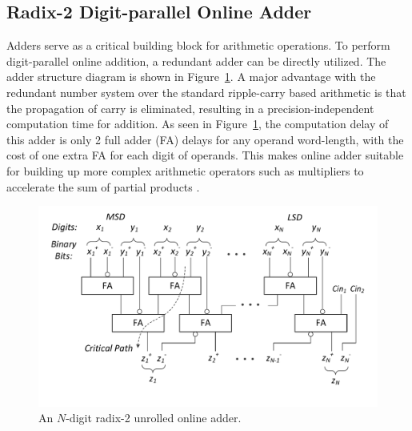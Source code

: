\documentclass{acm_proc_article-sp}
\begin{document}
\subsection{Radix-2 Digit-parallel Online Adder}\label{subsec:OnlineAdder}
Adders serve as a critical building block for arithmetic operations. To perform digit-parallel online addition, a redundant adder can be directly utilized. The adder structure diagram is shown in Figure~\ref{Fig:Radix2SD_adder}. A major advantage with the redundant number system over the standard ripple-carry based arithmetic is that the propagation of carry is eliminated, resulting in a precision-independent computation time for addition. As seen in Figure~\ref{Fig:Radix2SD_adder}, the computation delay of this adder is only 2 full adder (FA) delays for any operand word-length, with the cost of one extra FA for each digit of operands. This makes online adder suitable for building up more complex arithmetic operators such as multipliers to accelerate the sum of partial products \cite{RedundantMult_1987,RedundantMult_1985}.
% 
%
\begin{figure}
\includegraphics[width=.5\textwidth]{./Figures/SDAdder.pdf}
\vspace{-8.5ex}
\caption{An $N$-digit radix-2 unrolled online adder.}
\label{Fig:Radix2SD_adder}
\end{figure}

\end{document}

